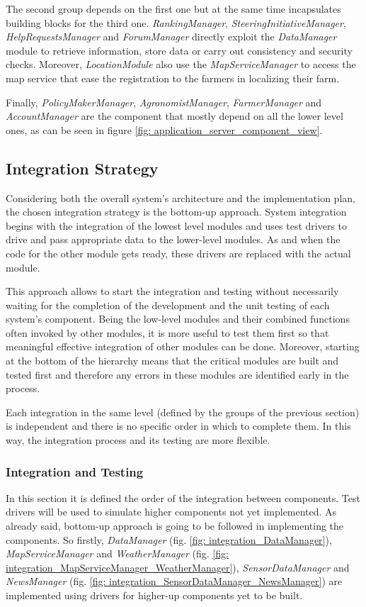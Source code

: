 \documentclass[table, 12pt]{article}
\begin{document}
The second group depends on the first one but at the same time incapsulates building blocks for the third one.  \emph{RankingManager}, \emph{SteeringInitiativeManager}, \emph{HelpRequestsManager} and \emph{ForumManager} directly exploit the \emph{DataManager} module to retrieve information, store data or carry out consistency and security checks. Moreover, \emph{LocationModule} also use the \emph{MapServiceManager} to access the map service that ease the registration to the farmers in localizing their farm. 

Finally, \emph{PolicyMakerManager}, \emph{AgronomistManager}, \emph{FarmerManager} and \emph{AccountManager} are the component that mostly depend on all the lower level ones, as can be seen in figure \ref{fig: application_server_component_view}.
\subsection{Integration Strategy}
Considering both the overall system's architecture and the implementation
plan, the chosen integration strategy is the bottom-up approach. System
integration begins with the integration of the lowest level modules and uses
test drivers to drive and pass appropriate data to the lower-level modules. As
and when the code for the other module gets ready, these drivers are replaced
with the actual module.

This approach allows to start the integration and testing without necessarily
waiting for the completion of the development and the unit testing of each
system's component. Being the low-level modules and their combined functions
often invoked by other modules, it is more useful to test them first so that
meaningful effective integration of other modules can be done. Moreover,
starting at the bottom of the hierarchy means that the critical modules are built
and tested first and therefore any errors in these modules are identified early in
the process.

Each integration in the same level (defined by the groups of the previous
section) is independent and there is no specific order in which to complete them.
In this way, the integration process and its testing are more flexible.

\subsubsection{Integration and Testing}
In this section it is defined the order of the integration between components. Test drivers will be used to simulate higher components not yet implemented.
As already said, bottom-up approach is going to be followed in implementing the components. So firstly, \emph{DataManager} (fig. \ref{fig: integration_DataManager}), \emph{MapServiceManager} and \emph{WeatherManager} (fig. \ref{fig: integration_MapServiceManager_WeatherManager}), \emph{SensorDataManager} and \emph{NewsManager} (fig. \ref{fig: integration_SensorDataManager_NewsManager}) are implemented using drivers for higher-up components yet to be built.
\end{document}
